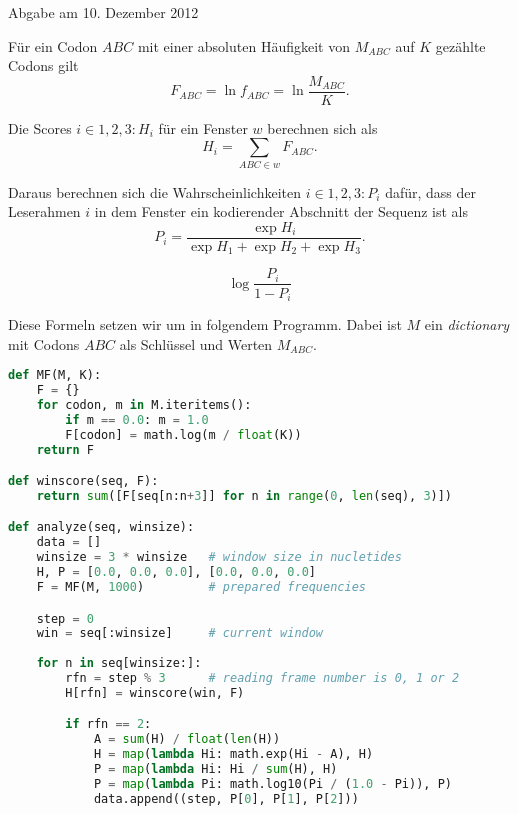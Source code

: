 \documentclass{homework}
\date{Montag, dem 3. Dezember 2012}
\author{Stefan Meißner (4279113) und Niels Hoppe (4356370)}
\begin{document}
\maketitle
\begin{enumerate} 


Abgabe am 10. Dezember 2012


Für ein Codon $ABC$ mit einer absoluten Häufigkeit von $M_{ABC}$ auf $K$
gezählte Codons gilt
$$F_{ABC} = \ln f_{ABC} = \ln \frac{M_{ABC}}{K}.$$

Die Scores $i \in {1,2,3}: H_i$ für ein Fenster $w$ berechnen sich als
$$H_i = \sum_{ABC \in w} F_{ABC}.$$

Daraus berechnen sich die Wahrscheinlichkeiten $i \in {1,2,3}: P_i$ dafür, dass
der Leserahmen $i$ in dem Fenster ein kodierender Abschnitt der Sequenz ist als
$$P_i = \frac{\exp H_i}{\exp H_1 + \exp H_2 + \exp H_3}.$$

$$\log \frac{P_i}{1-P_i}$$

Diese Formeln setzen wir um in folgendem Programm. Dabei ist $M$ ein
\textit{dictionary} mit Codons $ABC$ als Schlüssel und Werten $M_{ABC}$.

\begin{lstlisting}[language=python]
def MF(M, K):
	F = {}
	for codon, m in M.iteritems():
		if m == 0.0: m = 1.0
		F[codon] = math.log(m / float(K))
	return F

def winscore(seq, F):
	return sum([F[seq[n:n+3]] for n in range(0, len(seq), 3)])

def analyze(seq, winsize):
	data = []
	winsize = 3 * winsize	# window size in nucletides
	H, P = [0.0, 0.0, 0.0], [0.0, 0.0, 0.0]
	F = MF(M, 1000)			# prepared frequencies

	step = 0
	win = seq[:winsize]		# current window
	
	for n in seq[winsize:]:
		rfn = step % 3		# reading frame number is 0, 1 or 2
		H[rfn] = winscore(win, F)

		if rfn == 2:
			A = sum(H) / float(len(H))
			H = map(lambda Hi: math.exp(Hi - A), H)
			P = map(lambda Hi: Hi / sum(H), H)
			P = map(lambda Pi: math.log10(Pi / (1.0 - Pi)), P)
			data.append((step, P[0], P[1], P[2]))


\end{lstlisting}
\end{enumerate}
\end{document}
